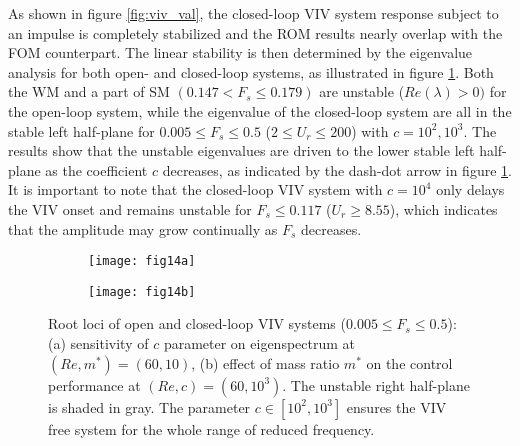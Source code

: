 \documentclass[standard]{jfm}
\begin{document}
As shown in figure \ref{fig:viv_val}, the closed-loop VIV system 
response subject to an impulse is completely stabilized and the ROM results nearly 
overlap with the FOM counterpart. The linear stability is then determined 
by the eigenvalue analysis for both open- and closed-loop systems,
as illustrated in figure \ref{fig:eig_viv}. Both the WM and a part of SM 
$(0.147 < F_{s} \le 0.179)$ are unstable ($Re(\lambda) > 0)$ for the open-loop system, 
while the eigenvalue of the closed-loop system are all in the stable left half-plane 
for $0.005 \leq F_s \leq 0.5$ ($2 \leq U_r \leq 200$) with $c=10^2, 10^3$. 
The results show that the unstable eigenvalues 
are driven to the lower stable left half-plane as the coefficient $c$ 
decreases, as indicated by the dash-dot arrow in figure \ref{fig:eig_viv}. It is 
important to note that the closed-loop VIV system with $c=10^4$ 
only delays the VIV onset and remains unstable for $F_s \leq 0.117$ ($U_r \geq 8.55$), 
which indicates that the amplitude may grow continually as $F_s$ decreases. 

\begin{figure}
\centering
\begin{subfigure}[b]{0.495\textwidth}
\centering
  \texttt{[image: fig14a]}
    \caption{}
    \label{fig:eig_viv}
    \end{subfigure} 
\begin{subfigure}[b]{0.495\textwidth} 
\centering
  \texttt{[image: fig14b]}
	\caption{}
	\label{fig:eig_viv_dm}
	\end{subfigure}	
        \caption{Root loci of open and closed-loop VIV systems ($0.005 \leq F_s \leq 0.5$): 
        (a) sensitivity of $c$ parameter on eigenspectrum at $(Re,m^*)=(60,10)$, 
        (b) effect of mass ratio $m^*$ on the control performance at $(Re,c)=(60,10^3)$. 
        The unstable right half-plane is shaded in gray. The parameter 
        $c \in [10^2,10^3]$ ensures the VIV free system for 
        the whole range of reduced frequency. 
        }
        \label{fig:viv_linear}
\end{figure}
\end{document}
